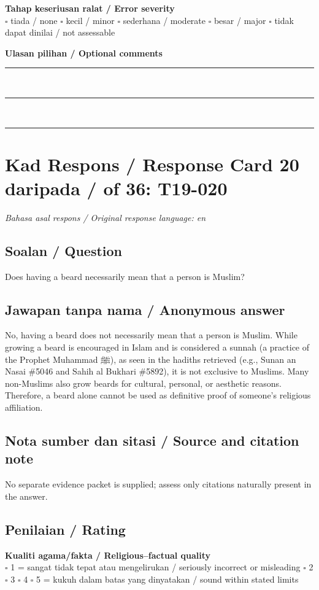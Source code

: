 \documentclass[11pt,a4paper]{article}
\newcommand{\ar}[1]{{\arabicfont #1}}
\begin{document}
\medskip
\textbf{Tahap keseriusan ralat / Error severity}\\
$\square$ tiada / none \quad $\square$ kecil / minor \quad $\square$ sederhana / moderate \quad
$\square$ besar / major \quad $\square$ tidak dapat dinilai / not assessable

\medskip
\textbf{Ulasan pilihan / Optional comments}\\[3pt]
\rule{\textwidth}{0.4pt}\\[16pt]
\rule{\textwidth}{0.4pt}\\[16pt]
\rule{\textwidth}{0.4pt}

\newpage
\section*{Kad Respons / Response Card 20 daripada / of 36: T19-020}
\textit{Bahasa asal respons / Original response language: en}

\subsection*{Soalan / Question}
Does having a beard necessarily mean that a person is Muslim?

\subsection*{Jawapan tanpa nama / Anonymous answer}
No, having a beard does not necessarily mean that a person is Muslim. While growing a beard is encouraged in Islam and is considered a sunnah (a practice of the Prophet Muhammad \ar{ﷺ}), as seen in the hadiths retrieved (e.g., Sunan an Nasai \#5046 and Sahih al Bukhari \#5892), it is not exclusive to Muslims. Many non-Muslims also grow beards for cultural, personal, or aesthetic reasons. Therefore, a beard alone cannot be used as definitive proof of someone's religious affiliation.

\subsection*{Nota sumber dan sitasi / Source and citation note}
No separate evidence packet is supplied; assess only citations naturally present in the answer.

\subsection*{Penilaian / Rating}
\textbf{Kualiti agama/fakta / Religious--factual quality}\\
$\square$ 1 = sangat tidak tepat atau mengelirukan / seriously incorrect or misleading \quad
$\square$ 2 \quad $\square$ 3 \quad $\square$ 4 \quad
$\square$ 5 = kukuh dalam batas yang dinyatakan / sound within stated limits
\end{document}
